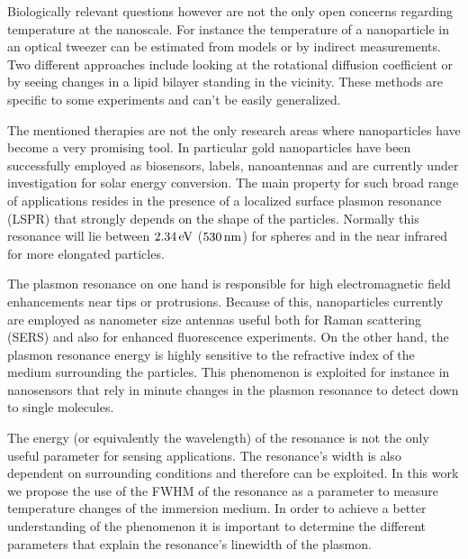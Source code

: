 Biologically relevant questions however are not the only open concerns regarding
temperature at the nanoscale. For instance the temperature of a nanoparticle in
an optical tweezer can be estimated from models\cite{Ruijgrok2011a} or by
indirect measurements. Two different approaches include looking at the
rotational diffusion coefficient\cite{Trojek2012} or by seeing
changes in a lipid bilayer standing in the vicinity\cite{Ma2014a,Urban2009}.
These methods are specific to some experiments and can't be easily generalized.

The mentioned therapies are not the only research areas where nanoparticles have
become a very promising tool. In particular gold nanoparticles have been
successfully employed as biosensors\cite{Zijlstra2012,Beuwer2015},
labels\cite{Spillane2014,Conde2013}, nanoantennas\cite{Schuller2010b,Leduc2013}
and are currently under investigation for solar energy
conversion\cite{Catchpole2008}. The main property for such broad range of
applications resides in the presence of a localized surface plasmon resonance
(LSPR) that strongly depends on the shape of the particles\cite{Zijlstra2011}.
Normally this resonance will lie between $2.34\,\textrm{eV}$ ($530\,\textrm{nm}$) for spheres and in 
the near infrared for more elongated particles.

The plasmon resonance on one hand is responsible for high electromagnetic field
enhancements near tips or protrusions\cite{Beversluis2003a,Mohamed2000}.
Because of this, nanoparticles currently are employed as nanometer size antennas
useful both for Raman scattering (SERS)\cite{Sivapalan2013} and also for
enhanced fluorescence\cite{Yuan2013,Khatua2014} experiments. On the other hand,
the plasmon resonance energy is highly sensitive to the refractive
index\cite{Prasad2015} of the medium surrounding the particles. This phenomenon
is exploited for instance in nanosensors that rely in minute changes in the
plasmon resonance to detect down to single molecules\cite{Zijlstra2012}.

The energy (or equivalently the wavelength) of the resonance is not the only
useful parameter for sensing applications. The resonance's width is also
dependent on surrounding conditions\cite{Liu2009b,Konrad2013} and therefore can
be exploited. In this work we propose the use of the FWHM of the resonance as a
parameter to measure temperature changes of the immersion medium. In order to
achieve a better understanding of the phenomenon it is important to determine
the different parameters that explain the resonance's linewidth of the plasmon.

